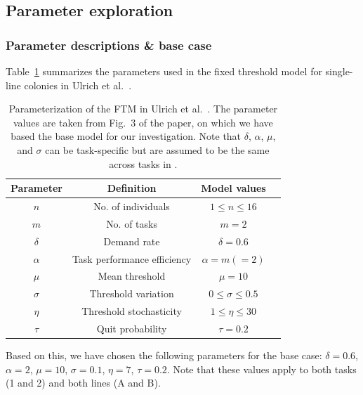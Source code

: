 \documentclass[11pt]{article}
\begin{document}
\subsection{Parameter exploration}

\subsubsection{Parameter descriptions \& base case} \label{sec:original}
Table~\ref{tab:original} summarizes the parameters used in the fixed threshold model for single-line colonies in Ulrich et al.~\cite{ulrich2018}.
\begin{table}[H] \small
  \begin{center}
    \begin{tabular}{|c|c|c|c|} 
      \hline
      \textbf{Parameter} & \textbf{Definition} & \textbf{Model values} \\ \hline
      $n$ & No. of individuals & $1\leq n \leq16$ \\ \hline
      $m$ & No. of tasks & $m = 2$ \\ \hline
      $\delta$ & Demand rate & $\delta = 0.6$  \\ \hline
      $\alpha$ & Task performance efficiency & $\alpha = m(=2) $  \\ \hline
      $\mu$ & Mean threshold & $\mu = 10$  \\ \hline
      $\sigma$ & Threshold variation & $0 \leq \sigma \leq 0.5$  \\ \hline
      $\eta$ & Threshold stochasticity & $1 \leq \eta \leq 30 $ \\ \hline
      $\tau$ & Quit probability & $\tau = 0.2$ \\ \hline
    \end{tabular}
    \caption{Parameterization of the FTM in Ulrich et al.~\cite{ulrich2018}. The parameter values are taken from Fig.~3 of the paper, on which we have based the base model for our investigation. Note that $\delta$, $\alpha$, $\mu$, and $\sigma$ can be task-specific but are assumed to be the same across tasks in \cite{ulrich2018}.}
    \label{tab:original}
  \end{center}
\end{table}

\vspace{-20pt}
Based on this, we have chosen the following parameters for the base case: $\delta = 0.6$, $\alpha = 2$, $\mu = 10$, $\sigma = 0.1$, $\eta = 7$, $\tau = 0.2$. Note that these values apply to both tasks (1 and 2) and both lines (A and B).
\end{document}

